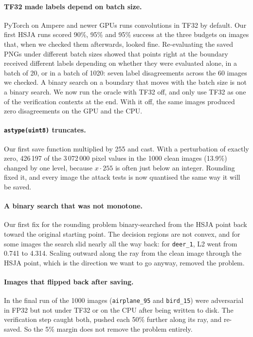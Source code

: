 \documentclass[11pt]{article}
\begin{document}
\paragraph{TF32 made labels depend on batch size.} PyTorch on Ampere and newer GPUs runs convolutions in TF32 by default. Our first HSJA runs scored 90\%, 95\% and 95\% success at the three budgets on images that, when we checked them afterwards, looked fine. Re-evaluating the saved PNGs under different batch sizes showed that points right at the boundary received different labels depending on whether they were evaluated alone, in a batch of 20, or in a batch of 1020: seven label disagreements across the 60 images we checked. A binary search on a boundary that moves with the batch size is not a binary search. We now run the oracle with TF32 off, and only use TF32 as one of the verification contexts at the end. With it off, the same images produced zero disagreements on the GPU and the CPU.

\paragraph{\texttt{astype(uint8)} truncates.} Our first save function multiplied by 255 and cast. With a perturbation of exactly zero, 426\,197 of the 3\,072\,000 pixel values in the 1000 clean images (13.9\%) changed by one level, because $x\cdot 255$ is often just below an integer. Rounding fixed it, and every image the attack tests is now quantised the same way it will be saved.

\paragraph{A binary search that was not monotone.} Our first fix for the rounding problem binary-searched from the HSJA point back toward the original starting point. The decision regions are not convex, and for some images the search slid nearly all the way back: for \texttt{deer\_1}, L2 went from 0.741 to 4.314. Scaling outward along the ray from the clean image through the HSJA point, which is the direction we want to go anyway, removed the problem.

\paragraph{Images that flipped back after saving.} In the final run \nFixed{} of the 1000 images (\texttt{airplane\_95} and \texttt{bird\_15}) were adversarial in FP32 but not under TF32 or on the CPU after being written to disk. The verification step caught both, pushed each 50\% further along its ray, and re-saved. So the 5\% margin does not remove the problem entirely.
\end{document}

